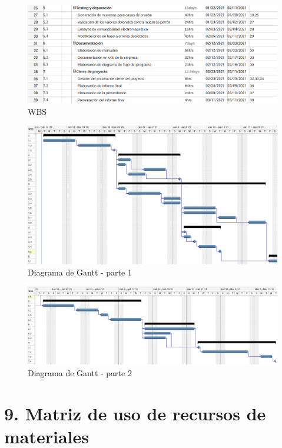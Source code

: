 \documentclass[11pt]{charter}
\begin{document}
\begin{figure}[htpb]
\centering 
\includegraphics[width=.8\textwidth]{./Figuras/wbs2.png}
\caption{WBS}
\label{fig:wbs2}
\end{figure}

\begin{figure}[htpb]
\centering 
\includegraphics[width=1\textwidth]{./Figuras/gantt1.png}
\caption{Diagrama de Gantt - parte 1}
\label{fig:gantt1}
\end{figure}

\begin{figure}[htb]
\centering 
\includegraphics[width=1\textwidth]{./Figuras/gantt2.png}
\caption{Diagrama de Gantt - parte 2}
\label{fig:gantt2}
\end{figure}


\section{9. Matriz de uso de recursos de materiales}
\label{sec:recursos}
\end{document}
